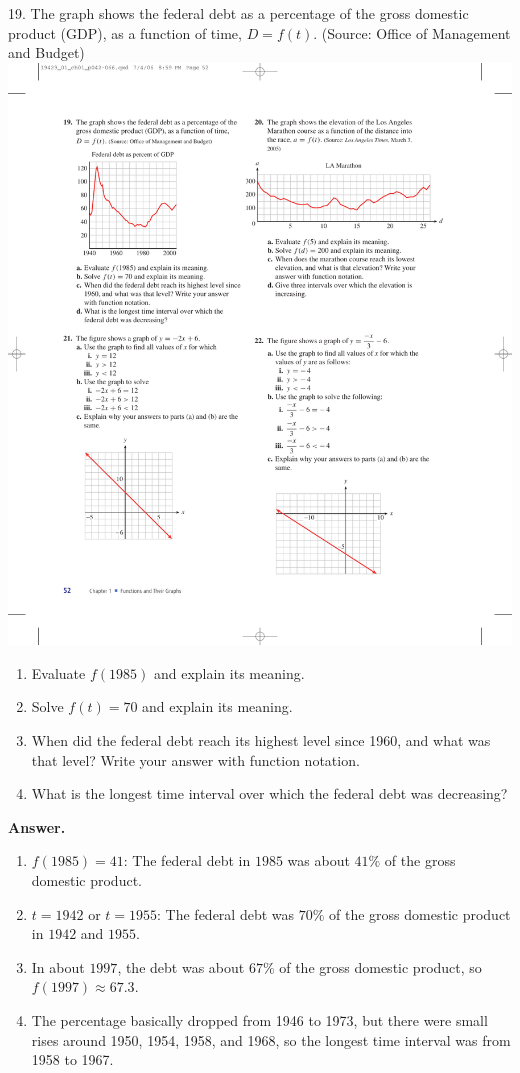\documentclass[10pt,]{book}
\theoremstyle{plain}
\theoremstyle{definition}
\theoremstyle{definition}
\theoremstyle{definition}
\theoremstyle{definition}
\numberwithin{equation}{part}
\begin{document}
\begin{exerciselist}
\item[19.]\hypertarget{exercise-176}{}The graph shows the federal debt as a percentage of the gross domestic product (GDP), as a function of time, \(D = f (t)\). (Source: Office of Management and Budget) \includegraphics[width=0.5\linewidth]{images/fig-ex-1-3-19}
 \leavevmode%
\begin{enumerate}[label=*\alph**]
\item\hypertarget{li-728}{}Evaluate \(f (1985)\) and explain its meaning.%
\item\hypertarget{li-729}{}Solve \(f (t) = 70\) and explain its meaning.%
\item\hypertarget{li-730}{}When did the federal debt reach its highest level since 1960, and what was that level? Write your answer with function notation.%
\item\hypertarget{li-731}{}What is the longest time interval over which the federal debt was decreasing?%
\end{enumerate}
%
\par\smallskip
\par\smallskip
\noindent\textbf{Answer.}\hypertarget{answer-102}{}\quad
\leavevmode%
\begin{enumerate}[label=*\alph**]
\item\hypertarget{li-732}{}\(f (1985) = 41\): The federal debt in \(1985\) was about \(41\%\) of the gross domestic product.%
\item\hypertarget{li-733}{}\(t = 1942\) or \(t = 1955\): The federal debt was \(70\%\) of the gross domestic product in \(1942\) and \(1955\).%
\item\hypertarget{li-734}{}In about \(1997\), the debt was about \(67\%\) of the gross domestic product, so \(f (1997)\approx 67.3\).%
\item\hypertarget{li-735}{}The percentage basically dropped from 1946 to 1973, but there were small rises around 1950, 1954, 1958, and 1968, so the longest time interval was from 1958 to 1967.%

\end{enumerate}
\end{exerciselist}
\end{document}

